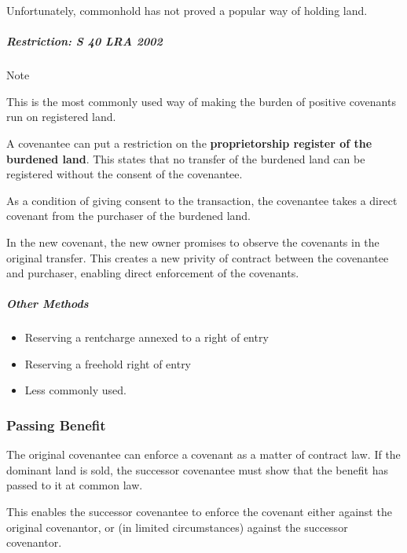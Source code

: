 \documentclass[
]{article}
\providecommand{\tightlist}{%
  \setlength{\itemsep}{0pt}\setlength{\parskip}{0pt}}
\newenvironment{env-8e984a52-6a47-430d-9005-822950744b1a}
{
    \savenotes\tcolorbox[blanker,breakable,left=5pt,borderline west={2pt}{-4pt}{blue}]
}
{
    \endtcolorbox\spewnotes
}
\begin{document}
Unfortunately, commonhold has not proved a popular way of holding land.

\hypertarget{restriction-s-40-lra-2002}{%
\subparagraph{Restriction: S 40 LRA
2002}\label{restriction-s-40-lra-2002}}

\begin{env-8e984a52-6a47-430d-9005-822950744b1a}

Note

This is the most commonly used way of making the burden of positive
covenants run on registered land.

\end{env-8e984a52-6a47-430d-9005-822950744b1a}

A covenantee can put a restriction on the \textbf{proprietorship
register of the burdened land}. This states that no transfer of the
burdened land can be registered without the consent of the covenantee.

As a condition of giving consent to the transaction, the covenantee
takes a direct covenant from the purchaser of the burdened land.

In the new covenant, the new owner promises to observe the covenants in
the original transfer. This creates a new privity of contract between
the covenantee and purchaser, enabling direct enforcement of the
covenants.

\hypertarget{other-methods-1}{%
\subparagraph{Other Methods}\label{other-methods-1}}

\begin{itemize}
\tightlist
\item
  Reserving a rentcharge annexed to a right of entry
\item
  Reserving a freehold right of entry
\item
  Less commonly used.
\end{itemize}

\hypertarget{passing-benefit}{%
\subsubsection{Passing Benefit}\label{passing-benefit}}

The original covenantee can enforce a covenant as a matter of contract
law. If the dominant land is sold, the successor covenantee must show
that the benefit has passed to it at common law.

This enables the successor covenantee to enforce the covenant either
against the original covenantor, or (in limited circumstances) against
the successor covenantor.
\end{document}
